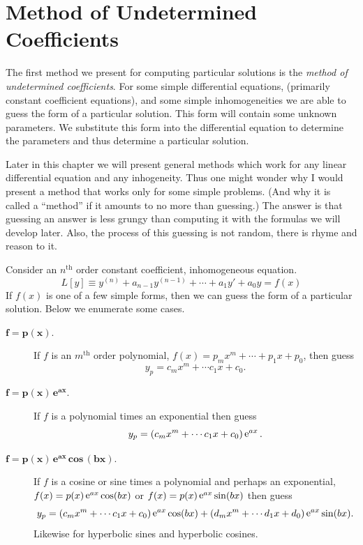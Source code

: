 \section{Method of Undetermined Coefficients}



The first method we present for computing particular solutions is the
\textit{method of undetermined coefficients}.
For some simple differential equations, (primarily constant coefficient 
equations), and some simple inhomogeneities we are able to guess the form
of a particular solution.  This form will contain some unknown parameters.
We substitute this form into the differential equation to determine 
the parameters and thus determine a particular solution.

Later in this chapter we will present general methods which work for any 
linear differential equation and any inhogeneity.  Thus one might wonder why
I would present a method that works only for some simple problems. (And
why it is called a ``method'' if it amounts to no more than guessing.)
The answer is that guessing an answer is less grungy than computing it
with the formulas we will develop later.  Also, the process of this guessing
is not random, there is rhyme and reason to it.


Consider an $n^{\mathrm{th}}$ order constant coefficient, inhomogeneous equation.
\[
L[y] \equiv y^{(n)} + a_{n-1} y^{(n-1)} + \cdots + a_1 y' + a_0 y = f(x)
\]
If $f(x)$ is one of a few simple forms, then we can guess the form of a 
particular solution.  Below we enumerate some cases.

\begin{description}
\item[$\mathbf{ f = p(x) }$.]
  If $f$ is an $m^{\mathrm{th}}$ order polynomial, $f(x) = p_m x^m + \cdots + p_1 x + p_0$,
  then guess
  \[
  y_p = c_m x^m + \cdots c_1 x + c_0.
  \]
\item[$\mathbf{ f = p(x) \,\mathbf{e}^{a x} }$.]
  If $f$ is a polynomial times an exponential then guess
  \[
  y_p = ( c_m x^m + \cdots c_1 x + c_0 ) \mathop{\mathrm{e}}\nolimits^{a x}.
  \]
\item[$\mathbf{ f = p(x) \,\mathbf{e}^{a x} \,\mathbf{cos}\,(b x) }$.]
  If $f$ is a cosine or sine times a polynomial and perhaps an exponential, 
  $f(x) = p(x) \mathop{\mathrm{e}}\nolimits^{a x} \cos(b x)$ or $f(x) = p(x) \mathop{\mathrm{e}}\nolimits^{a x} \sin(b x)$
  then guess
  \[
  y_p = ( c_m x^m + \cdots c_1 x + c_0 ) \mathop{\mathrm{e}}\nolimits^{a x} \cos(b x) 
  + ( d_m x^m + \cdots d_1 x + d_0 ) \mathop{\mathrm{e}}\nolimits^{a x} \sin(b x).
  \]
  Likewise for hyperbolic sines and hyperbolic cosines.
\end{description}




